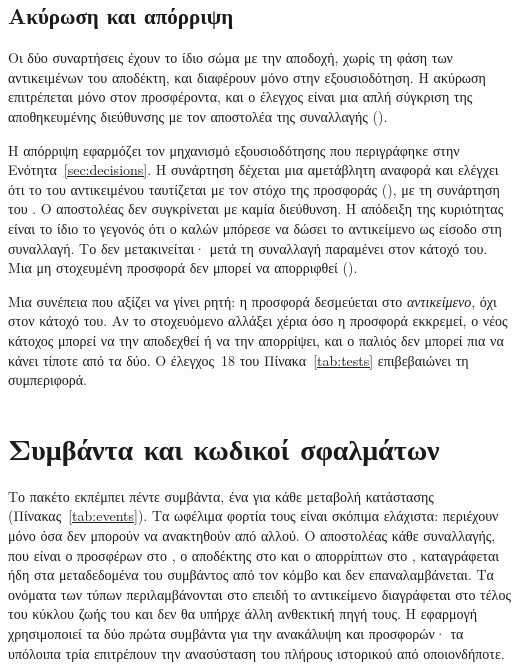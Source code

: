 \subsection{Ακύρωση και απόρριψη}
\label{sec:cancel-reject}



Οι δύο συναρτήσεις έχουν το ίδιο σώμα με την αποδοχή, χωρίς τη φάση των αντικειμένων του
αποδέκτη, και διαφέρουν μόνο στην εξουσιοδότηση. Η ακύρωση επιτρέπεται μόνο στον
προσφέροντα, και ο έλεγχος είναι μια απλή σύγκριση της αποθηκευμένης διεύθυνσης με τον
αποστολέα της συναλλαγής ().

Η απόρριψη εφαρμόζει τον μηχανισμό εξουσιοδότησης που περιγράφηκε στην
Ενότητα~\ref{sec:decisions}. Η συνάρτηση δέχεται μια αμετάβλητη αναφορά
 και ελέγχει ότι το  του αντικειμένου ταυτίζεται με τον στόχο της
προσφοράς (), με τη συνάρτηση  του
. Ο αποστολέας δεν συγκρίνεται με καμία διεύθυνση. Η απόδειξη της κυριότητας
είναι το ίδιο το γεγονός ότι ο καλών μπόρεσε να δώσει το αντικείμενο ως είσοδο στη
συναλλαγή. Το  δεν μετακινείται· μετά τη συναλλαγή παραμένει στον κάτοχό του. Μια
μη στοχευμένη προσφορά δεν μπορεί να απορριφθεί ().

Μια συνέπεια που αξίζει να γίνει ρητή: η προσφορά δεσμεύεται στο \emph{αντικείμενο}, όχι
στον κάτοχό του. Αν το στοχευόμενο  αλλάξει χέρια όσο η προσφορά εκκρεμεί, ο νέος
κάτοχος μπορεί να την αποδεχθεί ή να την απορρίψει, και ο παλιός δεν μπορεί πια να κάνει
τίποτε από τα δύο. Ο έλεγχος~18 του Πίνακα~\ref{tab:tests} επιβεβαιώνει τη συμπεριφορά.

\section{Συμβάντα και κωδικοί σφαλμάτων}
\label{sec:events-errors}

Το πακέτο εκπέμπει πέντε συμβάντα, ένα για κάθε μεταβολή κατάστασης
(Πίνακας~\ref{tab:events}). Τα ωφέλιμα φορτία τους είναι σκόπιμα ελάχιστα: περιέχουν μόνο
όσα δεν μπορούν να ανακτηθούν από αλλού. Ο αποστολέας κάθε συναλλαγής, που είναι ο
προσφέρων στο , ο αποδέκτης στο  και ο απορρίπτων στο
, καταγράφεται ήδη στα μεταδεδομένα του συμβάντος από τον κόμβο και δεν
επαναλαμβάνεται. Τα ονόματα των τύπων περιλαμβάνονται στο  επειδή το
αντικείμενο  διαγράφεται στο τέλος του κύκλου ζωής του και δεν θα υπήρχε άλλη
ανθεκτική πηγή τους. Η εφαρμογή χρησιμοποιεί τα δύο πρώτα συμβάντα για την ανακάλυψη
 και προσφορών· τα υπόλοιπα τρία επιτρέπουν την ανασύσταση του πλήρους ιστορικού
από οποιονδήποτε.


